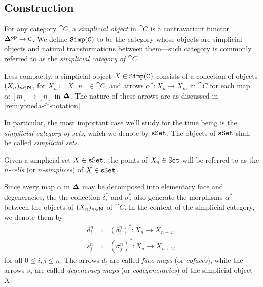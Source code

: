 \subsection{Construction}

\begin{definition}
    \label{def:simplicial-object}
    For any category \(\cat C\), a \emph{simplicial object} in \(\cat C\) is a
    contravariant functor \({\mathbf{\Delta}}^{\mathrm{op}} \to \texttt C\). We define \({\texttt{Simp}(\texttt C)}\) to
    be the category whose objects are simplicial objects and natural transformations
    between them---such category is commonly referred to as the \emph{simplicial
        category of \(\cat C\)}.
\end{definition}

\begin{notation}
    \label{not:unwrapping-the-definition}
    Less compactly, a simplicial object \(X \in {\texttt{Simp}(\texttt C)}\) consists of a
    collection of objects \((X_n)_{n \in \mathbf{N}}\), for
    \(X_n \coloneq X [n] \in \cat C\), and arrows \(\alpha^{*}: X_n \to X_m\) in
    \(\cat C\) for each map \(\alpha: [m] \to [n]\) in \({\mathbf{\Delta}}\). The nature of
    these arrows are as discussed in \cref{rem:yoneda-f*-notation}.
\end{notation}

\begin{notation}
    \label{not:simplicial-sets-notation-and-nomenclature}
    In particular, the most important case we'll study for the time being is the
    \emph{simplicial category of sets}, which we denote by \({\texttt{sSet}}\). The objects of
    \({\texttt{sSet}}\) shall be called \emph{simplicial sets}.\

    Given a simplicial set \(X \in {\texttt{sSet}}\), the points of \(X_n \in {\texttt{Set}}\) will be
    referred to as the \emph{\(n\)-cells} (or \emph{\(n\)-simplices}) of
    \(X \in {\texttt{sSet}}\).
\end{notation}

Since every map \(\alpha\) in \({\mathbf{\Delta}}\) may be decomposed into elementary face
and degeneracies, the the collection \(\delta_i^{*}\) and \(\sigma_j^{*}\) also
generate the morphisms \(\alpha^{*}\) between the objects of
\((X_n)_{n \in \mathbf{N}}\) of \(\cat C\). In the context of the simplicial category,
we denote them by
\begin{align*}
    d_i^n & \coloneq (\delta_i^n)^{*}: X_n \longrightarrow X_{n-1}, \\
    s_j^n & \coloneq (\sigma_j^n)^{*}: X_n \longrightarrow X_{n+1},
\end{align*}
for all \(0 \leq i, j \leq n\). The arrows \(d_i\) are called \emph{face maps}
(or \emph{cofaces}), while the arrows \(s_j\) are called \emph{degeneracy maps}
(or \emph{codegeneracies}) of the simplicial object \(X\).

